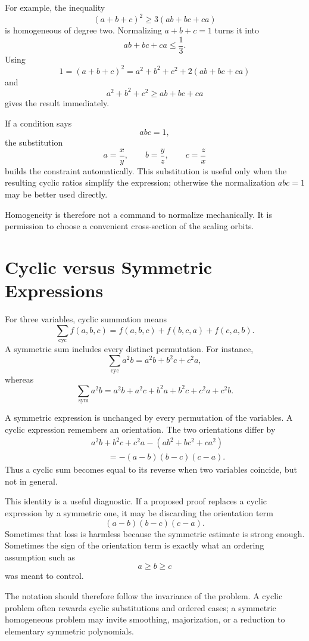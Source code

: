 For example, the inequality
\[
  (a+b+c)^2\ge3(ab+bc+ca)
\]
is homogeneous of degree two.  Normalizing \(a+b+c=1\) turns it into
\[
  ab+bc+ca\le\frac13.
\]
Using
\[
  1=(a+b+c)^2
  =a^2+b^2+c^2+2(ab+bc+ca)
\]
and
\[
  a^2+b^2+c^2\ge ab+bc+ca
\]
gives the result immediately.

If a condition says
\[
  abc=1,
\]
the substitution
\[
  a=\frac{x}{y},
  \qquad
  b=\frac{y}{z},
  \qquad
  c=\frac{z}{x}
\]
builds the constraint automatically.  This substitution is useful only when the resulting cyclic ratios simplify the expression; otherwise the normalization \(abc=1\) may be better used directly.

Homogeneity is therefore not a command to normalize mechanically.  It is permission to choose a convenient cross-section of the scaling orbits.

\section{Cyclic versus Symmetric Expressions}

For three variables, cyclic summation means
\[
  \sum_{\mathrm{cyc}}f(a,b,c)
  =f(a,b,c)+f(b,c,a)+f(c,a,b).
\]
A symmetric sum includes every distinct permutation.  For instance,
\[
  \sum_{\mathrm{cyc}}a^2b
  =a^2b+b^2c+c^2a,
\]
whereas
\[
  \sum_{\mathrm{sym}}a^2b
  =a^2b+a^2c+b^2a+b^2c+c^2a+c^2b.
\]

A symmetric expression is unchanged by every permutation of the variables.  A cyclic expression remembers an orientation.  The two orientations differ by
\[
\begin{aligned}
&a^2b+b^2c+c^2a
-(ab^2+bc^2+ca^2)\\
&\qquad=-(a-b)(b-c)(c-a).
\end{aligned}
\]
Thus a cyclic sum becomes equal to its reverse when two variables coincide, but not in general.

This identity is a useful diagnostic.  If a proposed proof replaces a cyclic expression by a symmetric one, it may be discarding the orientation term
\[
  (a-b)(b-c)(c-a).
\]
Sometimes that loss is harmless because the symmetric estimate is strong enough.  Sometimes the sign of the orientation term is exactly what an ordering assumption such as
\[
  a\ge b\ge c
\]
was meant to control.

The notation should therefore follow the invariance of the problem.  A cyclic problem often rewards cyclic substitutions and ordered cases; a symmetric homogeneous problem may invite smoothing, majorization, or a reduction to elementary symmetric polynomials.

